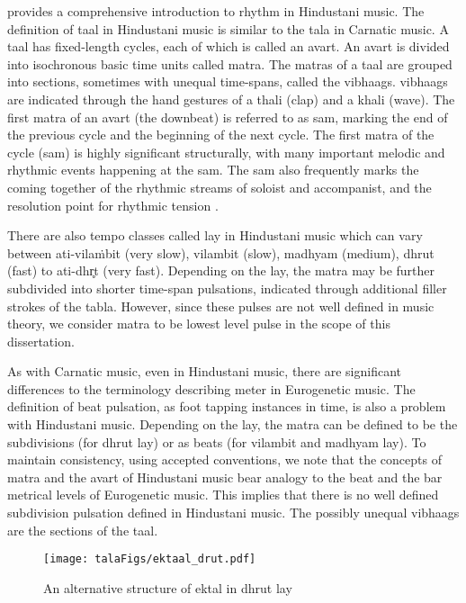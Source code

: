 % 
 provides a comprehensive introduction to rhythm in Hindustani music. The definition of \gls{taal} in Hindustani music is similar to the \gls{tala} in Carnatic music. A \gls{taal} has fixed-length cycles, each of which is called an \gls{avart}. An \gls{avart} is divided into isochronous basic time units called \gls{matra}. The \glspl{matra} of a \gls{taal} are grouped into sections, sometimes with unequal time-spans, called the \glspl{vibhaag}. \Glspl{vibhaag} are indicated through the hand gestures of a \gls{thali} (clap) and a \gls{khali} (wave). The first \gls{matra} of an \gls{avart} (the downbeat) is referred to as \gls{sam}, marking the end of the previous cycle and the beginning of the next cycle. The first \gls{matra} of the cycle (\gls{sam}) is highly significant structurally, with many important melodic and rhythmic events happening at the sam. The sam also frequently marks the coming together of the rhythmic streams of soloist and accompanist, and the resolution point for rhythmic tension \cite[p. 81]{clayton:00:time}.

There are also tempo classes called \gls{lay} in Hindustani music which can vary between ati-vilaṁbit (very slow), \gls{vilambit} (slow), \gls{madhyam} (medium), \gls{dhrut} (fast) to ati-dhr̥t (very fast). Depending on the \gls{lay}, the \gls{matra} may be further subdivided into shorter time-span pulsations, indicated through additional filler strokes of the \gls{tabla}. However, since these pulses are not well defined in music theory, we consider \gls{matra} to be lowest level pulse in the scope of this dissertation.

As with Carnatic music, even in Hindustani music, there are significant differences to the terminology describing meter in Eurogenetic music. The definition of beat pulsation, as foot tapping instances in time, is also a problem with Hindustani music. Depending on the lay, the \gls{matra} can be defined to be the subdivisions (for \gls{dhrut} lay) or as beats (for \gls{vilambit} and \gls{madhyam} \gls{lay}). To maintain consistency, using accepted conventions, we note that the concepts of \gls{matra} and the \gls{avart} of Hindustani music bear analogy to the beat and the bar metrical levels of Eurogenetic music. This implies that there is no well defined subdivision pulsation defined in Hindustani music. The possibly unequal \glspl{vibhaag} are the sections of the \gls{taal}.
%
\begin{figure}
  \centering
 \texttt{[image: talaFigs/ektaal\_drut.pdf]}
\caption[\Gls{ektal} in \gls{dhrut} \gls{lay}]{An alternative structure of \Gls{ektal} in \gls{dhrut} \gls{lay}}\label{fig:taal:drutektal}
\end{figure}

